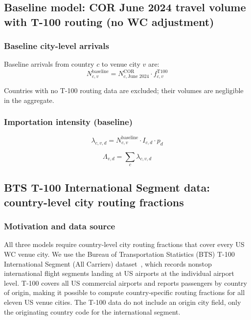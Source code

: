 \documentclass[12pt]{article}
\begin{document}
\subsection*{Baseline model: COR June 2024 travel volume with T-100 routing
(no WC adjustment)}

\subsubsection*{Baseline city-level arrivals}

Baseline arrivals from country $c$ to venue city $v$ are:
\begin{equation}
  N_{c,v}^{\text{baseline}} = N_{c,\text{June 2024}}^{\text{COR}}
    \cdot f_{c,v}^{\text{T100}}
  \label{eq:baseline_arrivals}
\end{equation}

Countries with no T-100 routing data are excluded; their volumes are
negligible in the aggregate.

\subsubsection*{Importation intensity (baseline)}

\begin{equation}
  \lambda_{c,v,d} = N_{c,v}^{\text{baseline}} \cdot I_{c,d} \cdot p_d
\end{equation}

\begin{equation}
  \Lambda_{v,d} = \sum_{c} \lambda_{c,v,d}
\end{equation}

\subsection*{BTS T-100 International Segment data: country-level
city routing fractions}

\subsubsection*{Motivation and data source}

All three models require country-level city routing fractions that
cover every US WC venue city. We use the Bureau of Transportation
Statistics (BTS) T-100 International Segment (All Carriers)
dataset~\cite{BTS_T100}, which records nonstop international flight
segments landing at US airports at the individual airport level.
T-100 covers all US commercial airports and reports passengers by
country of origin, making it possible to compute country-specific
routing fractions for all eleven US venue cities. The T-100 data do
not include an origin city field, only the originating country code
for the international segment.
\end{document}
